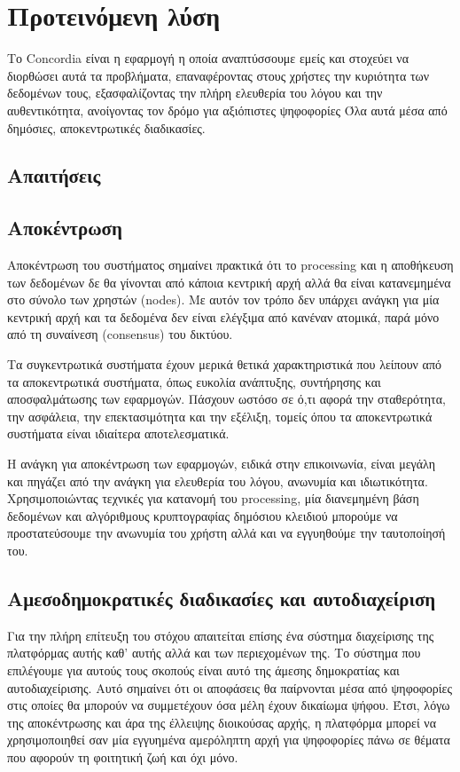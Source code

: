 \section{Προτεινόμενη λύση}

Το Concordia είναι η εφαρμογή η οποία αναπτύσσουμε εμείς και στοχεύει να διορθώσει αυτά τα προβλήματα, επαναφέροντας στους χρήστες την κυριότητα των δεδομένων τους, εξασφαλίζοντας την πλήρη ελευθερία του λόγου και την αυθεντικότητα, ανοίγοντας τον δρόμο για αξιόπιστες ψηφοφορίες
Όλα αυτά μέσα από δημόσιες, αποκεντρωτικές διαδικασίες.

\subsection{Απαιτήσεις}

\subsection{Αποκέντρωση}

Αποκέντρωση του συστήματος σημαίνει πρακτικά ότι το processing και η αποθήκευση των δεδομένων δε θα γίνονται από κάποια κεντρική αρχή αλλά θα είναι κατανεμημένα στο σύνολο των χρηστών (nodes). Με αυτόν τον τρόπο δεν υπάρχει ανάγκη για μία κεντρική αρχή και τα δεδομένα δεν είναι ελέγξιμα από κανέναν ατομικά, παρά μόνο από τη συναίνεση (consensus) του δικτύου.

Τα συγκεντρωτικά συστήματα έχουν μερικά θετικά χαρακτηριστικά που λείπουν από τα αποκεντρωτικά συστήματα, όπως ευκολία ανάπτυξης, συντήρησης και αποσφαλμάτωσης των εφαρμογών. Πάσχουν ωστόσο σε ό,τι αφορά την σταθερότητα, την ασφάλεια, την επεκτασιμότητα και την εξέλιξη, τομείς όπου τα αποκεντρωτικά συστήματα είναι ιδιαίτερα αποτελεσματικά.

Η ανάγκη για αποκέντρωση των εφαρμογών, ειδικά στην επικοινωνία, είναι μεγάλη και πηγάζει από την ανάγκη για ελευθερία του λόγου, ανωνυμία και ιδιωτικότητα. Χρησιμοποιώντας τεχνικές για κατανομή του processing, μία διανεμημένη βάση δεδομένων και αλγόριθμους κρυπτογραφίας δημόσιου κλειδιού μπορούμε να προστατεύσουμε την ανωνυμία του χρήστη αλλά και να εγγυηθούμε την ταυτοποίησή του.

\subsection{Αμεσοδημοκρατικές διαδικασίες και αυτοδιαχείριση}

Για την πλήρη επίτευξη του στόχου απαιτείται επίσης ένα σύστημα διαχείρισης της πλατφόρμας αυτής καθ’ αυτής αλλά και των περιεχομένων της. Το σύστημα που επιλέγουμε για αυτούς τους σκοπούς είναι αυτό της άμεσης δημοκρατίας και αυτοδιαχείρισης. Αυτό σημαίνει ότι οι αποφάσεις θα παίρνονται μέσα από ψηφοφορίες στις οποίες θα μπορούν να συμμετέχουν όσα μέλη έχουν δικαίωμα ψήφου. Έτσι, λόγω της αποκέντρωσης και άρα της έλλειψης διοικούσας αρχής, η πλατφόρμα μπορεί να χρησιμοποιηθεί σαν μία εγγυημένα αμερόληπτη αρχή για ψηφοφορίες πάνω σε θέματα που αφορούν τη φοιτητική ζωή και όχι μόνο.
